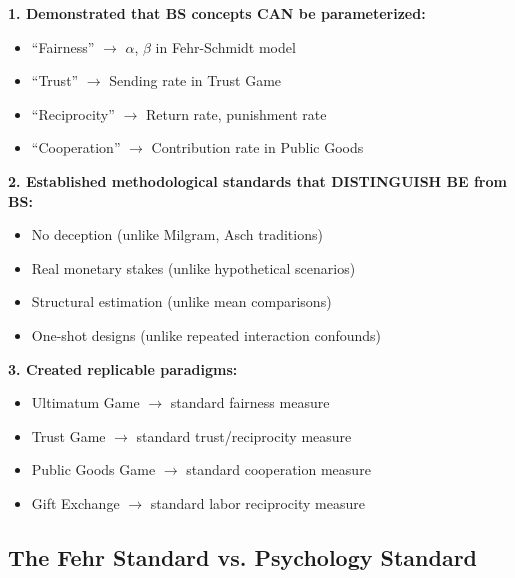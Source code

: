 \documentclass[11pt, a4paper]{article}
\begin{document}
\begin{tcolorbox}[colback=blue!5!white, colframe=blue!75!black,
    title=The Fehr Contribution to BE/BS Methodology]

\textbf{1. Demonstrated that BS concepts CAN be parameterized:}
\begin{itemize}[nosep]
    \item ``Fairness'' $\to$ $\alpha$, $\beta$ in Fehr-Schmidt model
    \item ``Trust'' $\to$ Sending rate in Trust Game
    \item ``Reciprocity'' $\to$ Return rate, punishment rate
    \item ``Cooperation'' $\to$ Contribution rate in Public Goods
\end{itemize}

\textbf{2. Established methodological standards that DISTINGUISH BE from BS:}
\begin{itemize}[nosep]
    \item No deception (unlike Milgram, Asch traditions)
    \item Real monetary stakes (unlike hypothetical scenarios)
    \item Structural estimation (unlike mean comparisons)
    \item One-shot designs (unlike repeated interaction confounds)
\end{itemize}

\textbf{3. Created replicable paradigms:}
\begin{itemize}[nosep]
    \item Ultimatum Game $\to$ standard fairness measure
    \item Trust Game $\to$ standard trust/reciprocity measure
    \item Public Goods Game $\to$ standard cooperation measure
    \item Gift Exchange $\to$ standard labor reciprocity measure
\end{itemize}

\end{tcolorbox}

\subsection{The Fehr Standard vs. Psychology Standard}
\end{document}
